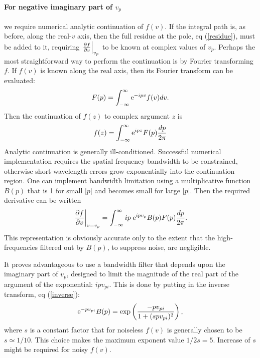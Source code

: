 \documentclass[12pt]{article}
\begin{document}
\paragraph{For negative imaginary part of $v_p$}  we require numerical
analytic continuation of $f(v)$. If the integral path is, as before, along the
real-$v$ axis, then the full residue at the pole, eq (\ref{residue}),
must be added to it, requiring $\left.\partial f\over \partial
v\right|_{v_p}$ to be known at complex values of $v_p$.  Perhaps the
most straightforward way to perform the continuation is by Fourier
transforming $f$. If $f(v)$ is known along the real axis, then its
Fourier transform can be evaluated:
\begin{equation}
  F(p) = \int_{-\infty}^\infty {\rm e}^{-ipv} f(v) dv .
\end{equation}
Then the continuation of $f(z)$ to complex argument $z$ is
\begin{equation}
  f(z)= \int_{-\infty}^\infty  {\rm e}^{ipz} F(p) {dp\over 2\pi}
\end{equation}
Analytic continuation is generally ill-conditioned. Successful
numerical implementation requires the spatial frequency bandwidth to
be constrained, otherwise short-wavelength errors grow exponentially
into the continuation region. One can implement bandwidth limitation
using a multiplicative function $B(p)$ that is 1 for small $|p|$ and
becomes small for large $|p|$. Then the required derivative can be
written
\begin{equation}\label{inverse}
\left.\partial f\over \partial v\right|_{v=v_p} = 
\int_{-\infty}^\infty ip\;  {\rm e}^{ipv_p} B(p) F(p)
         {dp\over 2\pi} .
\end{equation}
This representation is obviously accurate only to the extent that the
high-frequencies filtered out by $B(p)$, to suppress noise, are negligible.

It proves advantageous to use a bandwidth filter that depends upon the
imaginary part of $v_p$, designed to limit the magnitude of the real
part of the argument of the exponential: $ipv_{pi}$. This is done by
putting in the inverse transform, eq (\ref{inverse}): 
\begin{equation}
  {\rm e}^{-pv_{pi}} B(p) =  \exp\left({-p v_{pi}\over{1+(s p v_{pi})^2}}\right),
\end{equation}
where $s$ is a constant factor that for noiseless $f(v)$ is generally
chosen to be $s\simeq 1/10$. This choice makes the maximum exponent value
$1/2s=5$.  Increase of $s$ might be required for noisy $f(v)$.
\end{document}

